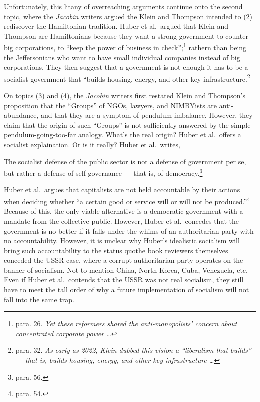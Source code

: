 \documentclass[12pt]{article}
\begin{document}
Unfortunately, this litany of overreaching arguments continue onto the second topic, where the \textit{Jacobin} writers argued the Klein and Thompson intended to (2) rediscover the Hamiltonian tradition. Huber et al.\ argued that Klein and Thompson are Hamiltonians because they want a strong government to counter big corporations, to ``keep the power of business in check'';\footnote{para. 26. \textit{Yet these reformers shared the anti-monopolists’ concern about concentrated corporate power \dots}} rathern than being the Jeffersonians who want to have small individual companies instead of big corporations. They then suggest that a government is not enough\textemdash{} it has to be a socialist government that ``builds housing, energy, and other key infrastructure.\footnote{para. 32. \textit{As early as 2022, Klein dubbed this vision a “liberalism that builds” — that is, builds housing, energy, and other key infrastructure \dots}}

On topics (3) and (4), the \textit{Jacobin} writers first restated Klein and Thompson's proposition that the ``Groups'' of NGOs, lawyers, and NIMBYists are anti-abundance, and that they are a symptom of pendulum imbalance. However, they claim that the origin of such ``Groups'' is not sufficiently answered by the simple pendulum-going-too-far analogy. What's the real origin? Huber et al.\ offers a socialist explaination. Or is it really? Huber et al.\ writes,

	The socialist defense of the public sector is not a defense of government per se, but rather a defense of self-governance — that is, of democracy.\footnote{para. 56.}

Huber et al.\ argues that capitalists are not held accountable by their actions when deciding whether ``a certain good or service will or will not be produced.''\footnote{para. 54.} Because of this, the only viable alternative is a democratic government with a mandate from the collective public. However, Huber et al.\ concedes that the government is no better if it falls under the whims of an authoritarian party with no accountability. However, it is unclear why Huber's idealistic socialism will bring such accountability to the status quo\textemdash{}the book reviewers themselves conceded the USSR case, where a corrupt authoritarian party operates on the banner of socialism. Not to mention China, North Korea, Cuba, Venezuela, etc. Even if Huber et al.\ contends that the USSR was not real socialism, they still have to meet the tall order of why a future implementation of socialism will not fall into the same trap.
\end{document}
